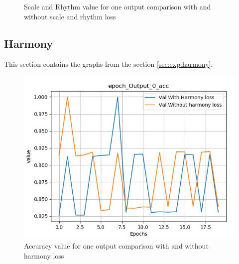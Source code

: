 \documentclass[12pt]{report}
\begin{document}
\begin{figure}[htbp]
\begin{minipage}{0.5 \textwidth}
\begin{center}
            \caption{Scale and Rhythm value for one output comparison with and without scale and rhythm loss}
            \label{fig:exp:scale-rhythm:all-output-comparison}
        \end{center}
    \end{minipage}
\end{figure}

\subsection{Harmony}
\label{appendix:harmony}

This section contains the graphs from the section \ref{sec:exp:harmony}.


\begin{figure}[htbp]
    \begin{minipage}{0.5\textwidth}
        \begin{center}
            \includegraphics[width=\textwidth]{images/experiences/harmony-rnn/acc-output-comparison-harmony.jpg}
            \caption{Accuracy value for one output comparison with and without harmony loss}
            \label{fig:acc-output-comparison-harmony}
        \end{center}
    \end{minipage} \hfill
    \begin{minipage}{0.5 \textwidth}
        \begin{center}

\end{center}
\end{minipage}
\end{figure}
\end{document}
